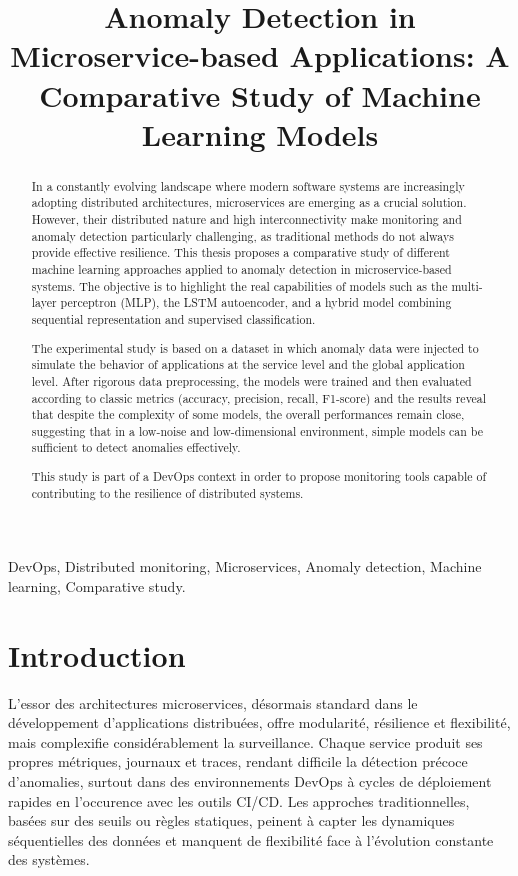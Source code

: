 \documentclass[conference]{IEEEtran}
\title{Anomaly Detection in Microservice-based Applications:
A Comparative Study of Machine Learning Models}
\author{
\IEEEauthorblockN{Darius TEMGOUA}
\IEEEauthorblockA{\textit{Université de Yaoundé I} \\
Yaoundé, Cameroun \\
steves.temgoua@facsciences-uy1.cm}
\and
\IEEEauthorblockN{Valéry MONTHE}
\IEEEauthorblockA{\textit{Université de Yaoundé I} \\
Yaoundé, Cameroun \\
valery.monthe@facsciences-uy1.cm}
}
\begin{document}
\maketitle

\begin{abstract}
In a constantly evolving landscape where modern software systems are increasingly adopting distributed architectures, microservices are emerging as a crucial solution. However, their distributed nature and high interconnectivity make monitoring and anomaly detection particularly challenging, as traditional methods do not always provide effective resilience. This thesis proposes a comparative study of different machine learning approaches applied to anomaly detection in microservice-based systems.
The objective is to highlight the real capabilities of models such as the multi-layer perceptron (MLP), the LSTM autoencoder, and a hybrid model combining sequential representation and supervised classification.

The experimental study is based on a dataset in which anomaly data were injected to simulate the behavior of applications at the service level and the global application level. After rigorous data preprocessing, the models were trained and then evaluated according to classic metrics (accuracy, precision, recall, F1-score) and the results reveal that despite the complexity of some models, the overall performances remain close, suggesting that in a low-noise and low-dimensional environment, simple models can be sufficient to detect anomalies effectively.

This study is part of a DevOps context in order to propose monitoring tools capable of contributing to the resilience of distributed systems.
\end{abstract}

\renewcommand{\IEEEkeywordsname}{Keywords}
\begin{IEEEkeywords}
DevOps, Distributed monitoring, Microservices, Anomaly detection, Machine learning, Comparative study.
\end{IEEEkeywords}


\section{Introduction}
L’essor des architectures microservices, désormais standard dans le développement d’applications distribuées, offre modularité, résilience et flexibilité, mais complexifie considérablement la surveillance. Chaque service produit ses propres métriques, journaux et traces, rendant difficile la détection précoce d’anomalies, surtout dans des environnements DevOps à cycles de déploiement rapides en l'occurence avec les outils CI/CD. Les approches traditionnelles, basées sur des seuils ou règles statiques, peinent à capter les dynamiques séquentielles des données et manquent de flexibilité face à l’évolution constante des systèmes.
\end{document}
